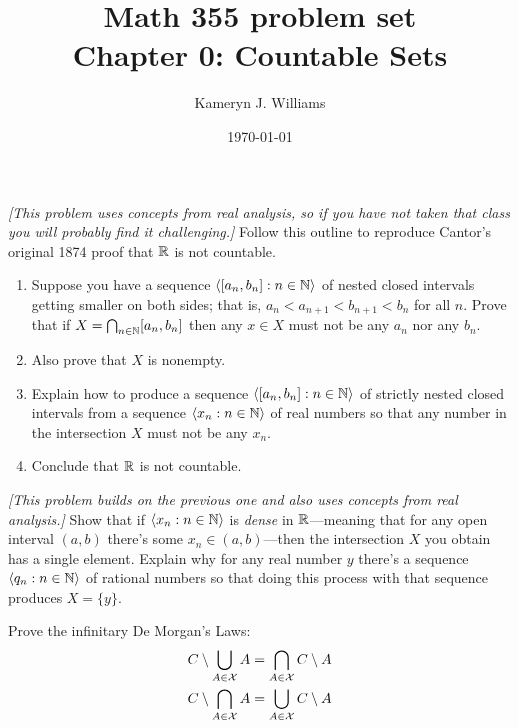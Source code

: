 \documentclass[10pt]{amsart}
\title{Math 355 problem set \\ Chapter 0: Countable Sets}
\author{Kameryn J. Williams}
\date{\today}
\begin{document}
\maketitle


\begin{problem}
\emph{[This problem uses concepts from real analysis, so if you have not taken that class you will probably find it challenging.]}
Follow this outline to reproduce Cantor's original 1874 proof that $\mathbb{R}$ is not countable. 
\begin{enumerate}
\item Suppose you have a sequence ${\left\langle [a_n,b_n] : n \in \mathbb{N} \right\rangle}$ of nested closed intervals getting smaller on both sides; that is, $a_n < a_{n+1} < b_{n+1} < b_n$ for all $n$. Prove that if $X = \bigcap_{n \in \mathbb{N}} [a_n,b_n]$ then any $x \in X$ must not be any $a_n$ nor any $b_n$.
\item Also prove that $X$ is nonempty.
\item Explain how to produce a sequence ${\left\langle [a_n,b_n] : n \in \mathbb{N} \right\rangle}$ of strictly nested closed intervals from a sequence ${\left\langle x_n : n \in \mathbb{N} \right\rangle}$ of real numbers so that any number in the intersection $X$ must not be any $x_n$.
\item Conclude that $\mathbb{R}$ is not countable.
\end{enumerate}
\end{problem}

\begin{problem}
\emph{[This problem builds on the previous one and also uses concepts from real analysis.]}
Show that if ${\left\langle x_n : n \in \mathbb{N} \right\rangle}$ is \emph{dense} in $\mathbb{R}$---meaning that for any open interval $(a,b)$ there's some $x_n \in (a,b)$---then the intersection $X$ you obtain has a single element. Explain why for any real number $y$ there's a sequence ${\left\langle q_n : n \in \mathbb{N} \right\rangle}$ of rational numbers so that doing this process with that sequence produces $X = \{y\}$.
\end{problem}


\begin{problem}
Prove the infinitary De Morgan's Laws:
\begin{align*}
C \setminus \bigcup_{A \in \mathcal{X}} A &= \bigcap_{A \in \mathcal{X}} C \setminus A \\
C \setminus \bigcap_{A \in \mathcal{X}} A &= \bigcup_{A \in \mathcal{X}} C \setminus A \\
\end{align*}
\end{problem}
\end{document}
